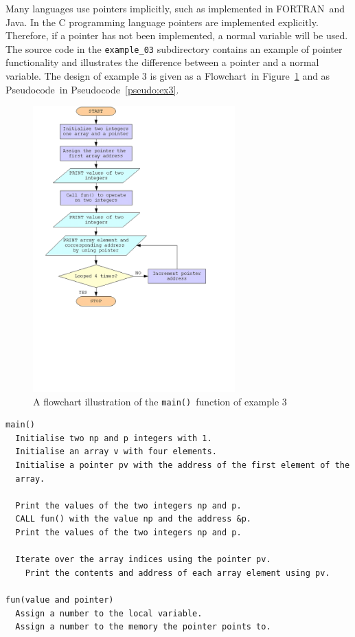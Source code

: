 \documentclass[11pt]{scrartcl}
\def\main{\texttt{main()}}
\def\psc{Pseudocode}
\def\flo{Flowchart}
\def\fortran{FORTRAN}
\begin{document}
Many languages use pointers implicitly, such as implemented in \fortran\ and Java.  In the 
C programming language pointers are implemented explicitly.  Therefore, if a pointer has not been implemented, a normal variable will be used.  The source code in the \texttt{example_03} subdirectory contains an example of pointer functionality and illustrates the difference between a pointer and a normal variable.  The design of example 3 is given as a \flo\ in Figure~\ref{figure:flowchart_ex3} and as \psc\ in \psc~\ref{pseudo:ex3}.

\begin{figure}[h]
\begin{center}
\includegraphics[height=11cm]{figures/ex3}
\caption{A flowchart illustration of the \main\ function of example 3
\label{figure:flowchart_ex3}}
\end{center}
\end{figure}

\begin{pseudocode}[h]
\begin{verbatim}
main()
  Initialise two np and p integers with 1.
  Initialise an array v with four elements.
  Initialise a pointer pv with the address of the first element of the
  array. 

  Print the values of the two integers np and p.
  CALL fun() with the value np and the address &p.
  Print the values of the two integers np and p.

  Iterate over the array indices using the pointer pv.
    Print the contents and address of each array element using pv.

fun(value and pointer)
  Assign a number to the local variable.
  Assign a number to the memory the pointer points to.
\end{verbatim}
\caption{A pseudocode implementation of example 3 \label{pseudo:ex3}}
\end{pseudocode}
\end{document}
